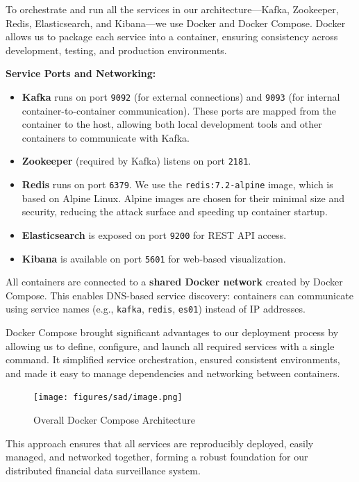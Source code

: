 To orchestrate and run all the services in our architecture—Kafka, Zookeeper, Redis, Elasticsearch, and Kibana—we use Docker and Docker Compose. Docker allows us to package each service into a container, ensuring consistency across development, testing, and production environments.

\textbf{Service Ports and Networking:}
\begin{itemize}
    \item \textbf{Kafka} runs on port \texttt{9092} (for external connections) and \texttt{9093} (for internal container-to-container communication). These ports are mapped from the container to the host, allowing both local development tools and other containers to communicate with Kafka.
    \item \textbf{Zookeeper} (required by Kafka) listens on port \texttt{2181}.
    \item \textbf{Redis} runs on port \texttt{6379}. We use the \texttt{redis:7.2-alpine} image, which is based on Alpine Linux. Alpine images are chosen for their minimal size and security, reducing the attack surface and speeding up container startup.
    \item \textbf{Elasticsearch} is exposed on port \texttt{9200} for REST API access.
    \item \textbf{Kibana} is available on port \texttt{5601} for web-based visualization.
\end{itemize}

All containers are connected to a \textbf{shared Docker network} created by Docker Compose. This enables DNS-based service discovery: containers can communicate using service names (e.g., \texttt{kafka}, \texttt{redis}, \texttt{es01}) instead of IP addresses.

Docker Compose brought significant advantages to our deployment process by allowing us to define, configure, and launch all required services with a single command. It simplified service orchestration, ensured consistent environments, and made it easy to manage dependencies and networking between containers.

\begin{figure}[H]
    \centering
    \texttt{[image: figures/sad/image.png]}
    \caption{Overall Docker Compose Architecture}
    \label{fig:docker_compose_architecture}
\end{figure}


This approach ensures that all services are reproducibly deployed, easily managed, and networked together, forming a robust foundation for our distributed financial data surveillance system.

